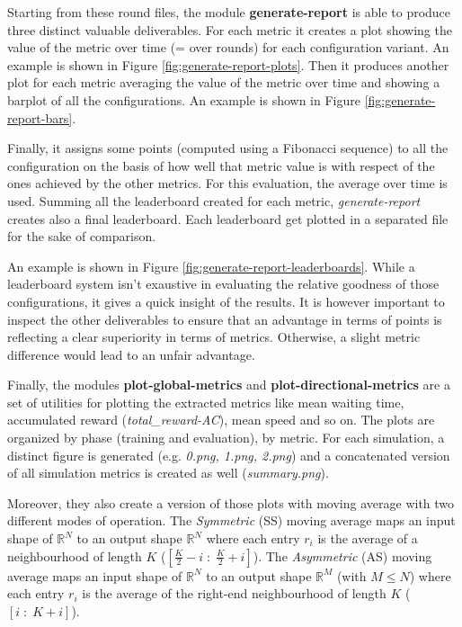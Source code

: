 Starting from these round files, the module \textbf{generate-report} is able to produce three distinct valuable deliverables.
For each metric it creates a plot showing the value of the metric over time (= over rounds) for each configuration variant.
An example is shown in Figure \ref{fig:generate-report-plots}.
Then it produces another plot for each metric averaging the value of the metric over time and showing a barplot of all the configurations.
An example is shown in Figure \ref{fig:generate-report-bars}.

Finally, it assigns some points (computed using a Fibonacci sequence) to all the configuration on the basis of how well that metric value is with respect of the ones achieved by the other metrics.
For this evaluation, the average over time is used.
Summing all the leaderboard created for each metric, \textit{generate-report} creates also a final leaderboard.
Each leaderboard get plotted in a separated file for the sake of comparison.

An example is shown in Figure \ref{fig:generate-report-leaderboards}.
While a leaderboard system isn't exaustive in evaluating the relative goodness of those configurations, it gives a quick insight of the results.
It is however important to inspect the other deliverables to ensure that an advantage in terms of points is reflecting a clear superiority in terms of metrics.
Otherwise, a slight metric difference would lead to an unfair advantage.

\putimagecouple
{}
{}

Finally, the modules \textbf{plot-global-metrics} and \textbf{plot-directional-metrics} are a set of utilities for plotting the extracted metrics like mean waiting time, accumulated reward (\textit{total\_reward-AC}), mean speed and so on.
The plots are organized by phase (training and evaluation), by metric. For each simulation, a distinct figure is generated (e.g. \textit{0.png, 1.png, 2.png}) and a concatenated version of all simulation metrics is created as well (\textit{summary.png}).

Moreover, they also create a version of those plots with moving average with two different modes of operation.
The \textit{Symmetric} (SS) moving average maps an input shape of $\mathbb{R}^N$ to an output shape $\mathbb{R}^N$ where each entry $r_i$ is the average of a neighbourhood of length $K$ ($[\frac K 2 - i \; : \; \frac K 2 + i]$).
The \textit{Asymmetric} (AS) moving average maps an input shape of $\mathbb{R}^N$ to an output shape $\mathbb{R}^M$ (with $M \leq N$) where each entry $r_i$ is the average of the right-end neighbourhood of length $K$ ($[i \; : \; K + i]$).

